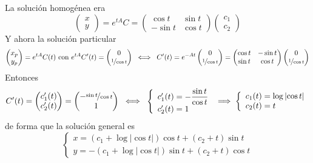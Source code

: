\begin{sol}
    La solución homogénea era
    $$\begin{pmatrix}
        x\\
        y
    \end{pmatrix}=e^{tA}C=\begin{pmatrix}
        \cos t & \sin t \\
        -\sin t & \cos t
    \end{pmatrix}\begin{pmatrix}
        c_1\\
        c_2
    \end{pmatrix}$$
    Y ahora la solución particular
    $$\begin{pmatrix}
        x_p\\
        y_p
    \end{pmatrix}=e^{tA} C(t) \text{ con } e^{tA} C'(t)=\begin{pmatrix}
        0 \\
        \nicefrac{1}{\cos t}
    \end{pmatrix} \; \iff \; C'(t)=e^{-At}\begin{pmatrix}
        0 \\
        \nicefrac{1}{\cos t}
    \end{pmatrix}=\begin{pmatrix}
        \cos t & -\sin t \\
        \sin t & \cos t
    \end{pmatrix}\begin{pmatrix}
        0 \\
        \nicefrac{1}{\cos t}
    \end{pmatrix}$$
    Entonces 
    $$C'(t)=\begin{pmatrix}
        c_1'(t) \\
        c_2'(t)
    \end{pmatrix}=\begin{pmatrix}
        -\nicefrac{\sin t }{\cos t} \\
        1
    \end{pmatrix} \; \iff \; \left\{ \begin{array}{l}
         c_1'(t)= -\dfrac{\sin t }{\cos t}  \\
         c_2'(t)=1
    \end{array} \right. \; \Longrightarrow \; \left\{ \begin{array}{l}
         c_1(t)= \log|{\cos t}|  \\
         c_2(t)=t
    \end{array} \right.$$
    de forma que la solución general es
    $$\left\{ \begin{array}{l}
        x=(c_1+\log|{\cos t}|)\cos t+(c_2+t)\sin t  \\
        y=-(c_1+\log|{\cos t}|)\sin t+(c_2+t)\cos t
    \end{array} \right.$$
\end{sol}

